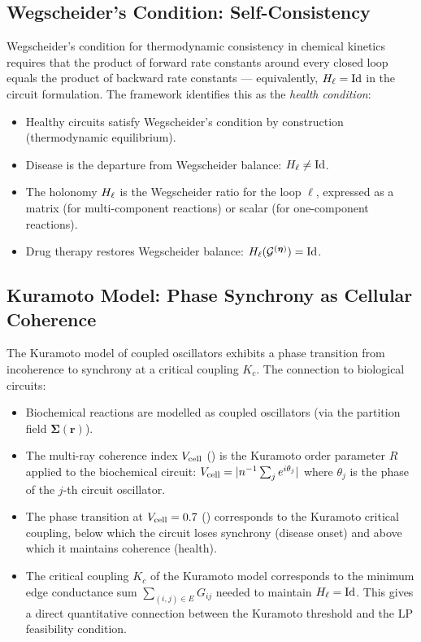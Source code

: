 \subsection{Wegscheider's Condition: Self-Consistency}

Wegscheider's condition \citep{Wegscheider1901} for thermodynamic consistency
in chemical kinetics requires that the product of forward rate constants around
every closed loop equals the product of backward rate constants — equivalently,
$H_\ell = \mathrm{Id}$ in the circuit formulation.  The framework identifies
this as the \emph{health condition}:

\begin{itemize}[leftmargin=2em]
  \item Healthy circuits satisfy Wegscheider's condition by construction
    (thermodynamic equilibrium).
  \item Disease is the departure from Wegscheider balance: $H_\ell \neq \mathrm{Id}$.
  \item The holonomy $H_\ell$ is the Wegscheider ratio for the loop $\ell$,
    expressed as a matrix (for multi-component reactions) or scalar (for
    one-component reactions).
  \item Drug therapy restores Wegscheider balance: $H_\ell(\mathcal{G}^{(\boldsymbol{\eta})}) = \mathrm{Id}$.
\end{itemize}

\subsection{Kuramoto Model: Phase Synchrony as Cellular Coherence}

The Kuramoto model of coupled oscillators \citep{Kuramoto1984} exhibits a
phase transition from incoherence to synchrony at a critical coupling $K_c$.
The connection to biological circuits:

\begin{itemize}[leftmargin=2em]
  \item Biochemical reactions are modelled as coupled oscillators (via the
    partition field $\boldsymbol{\Sigma}(\mathbf{r})$).
  \item The multi-ray coherence index $V_{\mathrm{cell}}$ () is the
    Kuramoto order parameter $R$ applied to the biochemical circuit:
    $V_{\mathrm{cell}} = |n^{-1}\sum_j e^{i\theta_j}|$ where $\theta_j$ is the phase
    of the $j$-th circuit oscillator.
  \item The phase transition at $V_{\mathrm{cell}} = 0.7$ ()
    corresponds to the Kuramoto critical coupling, below which the circuit
    loses synchrony (disease onset) and above which it maintains coherence
    (health).
  \item The critical coupling $K_c$ of the Kuramoto model corresponds to the
    minimum edge conductance sum $\sum_{(i,j) \in E} G_{ij}$ needed to maintain
    $H_\ell = \mathrm{Id}$.  This gives a direct quantitative connection between
    the Kuramoto threshold and the LP feasibility condition.
\end{itemize}

